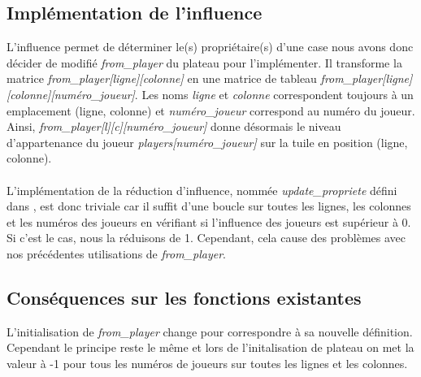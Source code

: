 \documentclass[a4paper]{article}
\begin{document}
\subsection{Implémentation de l'influence}

L'influence permet de déterminer le(s) propriétaire(s) d'une case nous avons donc décider de modifié \emph{from\_player} du plateau pour l'implémenter. Il transforme la matrice \emph{from\_player[ligne][colonne]} en une matrice de tableau \emph{from\_player[ligne][colonne][numéro\_joueur]}. Les noms \emph{ligne} et \emph{colonne} correspondent toujours à un emplacement (ligne, colonne) et \emph{numéro\_joueur} correspond au numéro du joueur. Ainsi, \emph{from\_player[l][c][numéro\_joueur]} donne désormais le niveau d'appartenance du joueur \emph{players[numéro\_joueur]} sur la tuile en position (ligne, colonne). \\
\\
L'implémentation de la réduction d'influence, nommée \emph{update\_propriete} défini dans , est donc triviale car il suffit d'une boucle sur toutes les lignes, les colonnes et les numéros des joueurs en vérifiant si l'influence des joueurs est supérieur à 0. Si c'est le cas, nous la réduisons de 1. Cependant, cela cause des problèmes avec nos précédentes utilisations de \emph{from\_player}.

\subsection{Conséquences sur les fonctions existantes}

L'initialisation de \emph{from\_player} change pour correspondre à sa nouvelle définition. Cependant le principe reste le même et lors de l'initalisation de plateau on met la valeur à -1 pour tous les numéros de joueurs sur toutes les lignes et les colonnes.\\
\\
\end{document}
